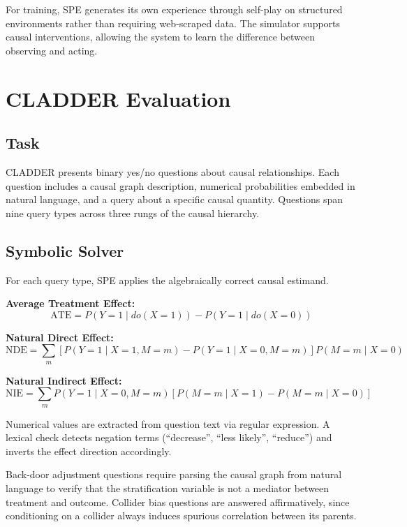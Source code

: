 \documentclass{article}
\begin{document}
For training, SPE generates its own experience through self-play on
structured environments rather than requiring web-scraped data. The
simulator supports causal interventions, allowing the system to learn
the difference between observing and acting.

\section{CLADDER Evaluation}

\subsection{Task}

CLADDER presents binary yes/no questions about causal relationships. Each
question includes a causal graph description, numerical probabilities
embedded in natural language, and a query about a specific causal quantity.
Questions span nine query types across three rungs of the causal hierarchy.

\subsection{Symbolic Solver}

For each query type, SPE applies the algebraically correct causal estimand.

\textbf{Average Treatment Effect:}
\begin{equation}
\text{ATE} = P(Y{=}1 \mid do(X{=}1)) - P(Y{=}1 \mid do(X{=}0))
\end{equation}

\textbf{Natural Direct Effect:}
\begin{equation}
\text{NDE} = \sum_m \left[P(Y{=}1 \mid X{=}1, M{=}m) - P(Y{=}1 \mid X{=}0, M{=}m)\right] P(M{=}m \mid X{=}0)
\end{equation}

\textbf{Natural Indirect Effect:}
\begin{equation}
\text{NIE} = \sum_m P(Y{=}1 \mid X{=}0, M{=}m)\left[P(M{=}m \mid X{=}1) - P(M{=}m \mid X{=}0)\right]
\end{equation}

Numerical values are extracted from question text via regular expression.
A lexical check detects negation terms (``decrease'', ``less likely'',
``reduce'') and inverts the effect direction accordingly.

Back-door adjustment questions require parsing the causal graph from
natural language to verify that the stratification variable is not a
mediator between treatment and outcome. Collider bias questions are
answered affirmatively, since conditioning on a collider always induces
spurious correlation between its parents.
\end{document}
